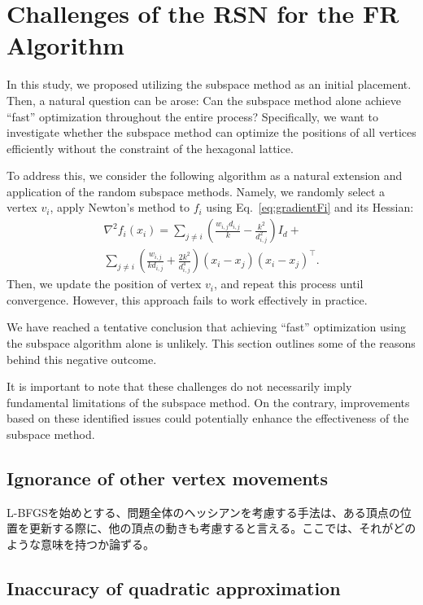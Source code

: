 \documentclass[dvipdfmx,journal]{IEEEtran}
\begin{document}
\section{Challenges of the RSN for the FR Algorithm}\label{sec:problemRSN}

In this study, we proposed utilizing the subspace method as an initial placement. Then, a natural question can be arose: Can the subspace method alone achieve ``fast'' optimization throughout the entire process?
Specifically, we want to investigate whether the subspace method can optimize the positions of all vertices efficiently without the constraint of the hexagonal lattice.

To address this, we consider the following algorithm as a natural extension and application of the random subspace methods. Namely, we randomly select a vertex $v_i$, apply Newton's method to $f_i$ using Eq.~\ref{eq:gradientFi} and its Hessian:
\begin{gather*}
  \nabla^2 f_i(x_i) = \sum_{j \neq i} \left(\frac{w_{i,j}d_{i,j}}{k} - \frac{k^2}{d_{i,j}^2}\right) I_d + \\
  \sum_{j \neq i} \left(\frac{w_{i,j}}{k d_{i,j}} + \frac{2k^2}{d_{i,j}^4}\right) (x_i - x_j)(x_i - x_j)^\top.
\end{gather*}
Then, we update the position of vertex $v_i$, and repeat this process until convergence.
However, this approach fails to work effectively in practice.

We have reached a tentative conclusion that achieving ``fast'' optimization using the subspace algorithm alone is unlikely.
This section outlines some of the reasons behind this negative outcome.

It is important to note that these challenges do not necessarily imply fundamental limitations of the subspace method. On the contrary, improvements based on these identified issues could potentially enhance the effectiveness of the subspace method.

\subsection{Ignorance of other vertex movements}\label{ssec:ignorance}

L-BFGSを始めとする、問題全体のヘッシアンを考慮する手法は、ある頂点の位置を更新する際に、他の頂点の動きも考慮すると言える。ここでは、それがどのような意味を持つか論ずる。

\subsection{Inaccuracy of quadratic approximation}\label{ssec:inaccuracy}
\end{document}

